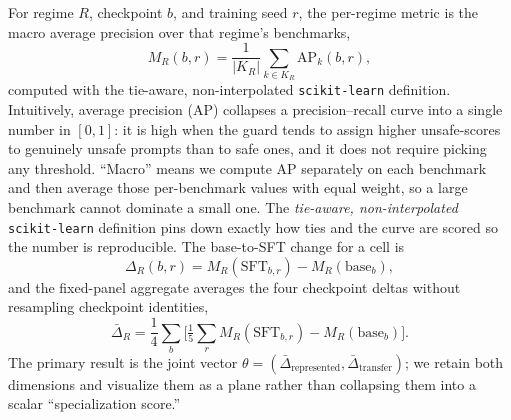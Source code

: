 \documentclass[11pt]{article}
\begin{document}
For regime $R$, checkpoint $b$, and training seed $r$, the per-regime metric is the macro average precision over that regime's benchmarks,
\begin{equation}
\label{eq:regime-metric}
M_R(b,r) = \frac{1}{|K_R|}\sum_{k\in K_R} \mathrm{AP}_k(b,r),
\end{equation}
computed with the tie-aware, non-interpolated \texttt{scikit-learn} definition. Intuitively, average precision (AP) collapses a precision--recall curve into a single number in $[0,1]$: it is high when the guard tends to assign higher unsafe-scores to genuinely unsafe prompts than to safe ones, and it does not require picking any threshold. ``Macro'' means we compute AP separately on each benchmark and then average those per-benchmark values with equal weight, so a large benchmark cannot dominate a small one. The \emph{tie-aware, non-interpolated} \texttt{scikit-learn} definition pins down exactly how ties and the curve are scored so the number is reproducible. The base-to-SFT change for a cell is
\begin{equation}
\label{eq:delta}
\Delta_R(b,r) = M_R(\mathrm{SFT}_{b,r}) - M_R(\mathrm{base}_b),
\end{equation}
and the fixed-panel aggregate averages the four checkpoint deltas without resampling checkpoint identities,
\begin{equation}
\label{eq:agg}
\bar\Delta_R = \frac{1}{4}\sum_b\Big[\tfrac{1}{5}\textstyle\sum_r M_R(\mathrm{SFT}_{b,r}) - M_R(\mathrm{base}_b)\Big].
\end{equation}
The primary result is the joint vector $\theta = (\bar\Delta_{\text{represented}}, \bar\Delta_{\text{transfer}})$; we retain both dimensions and visualize them as a plane rather than collapsing them into a scalar ``specialization score.''
\end{document}
